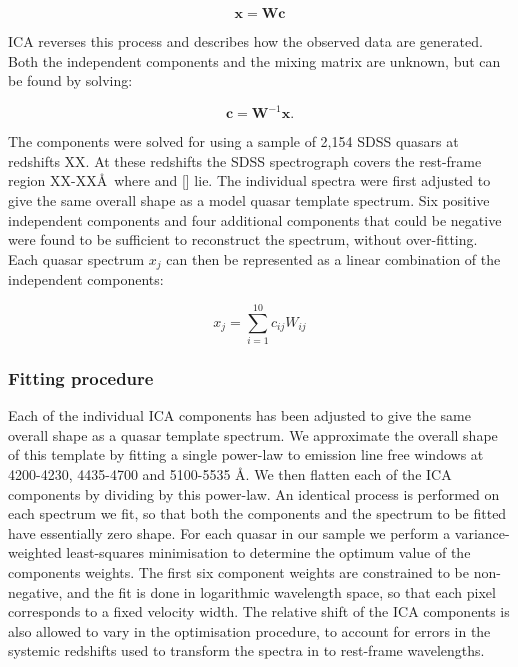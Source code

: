 \begin{equation}
    \bm{x} = \bm{W}\bm{c}
\end{equation}

\ac{ICA} reverses this process and describes how the observed data are generated. 
Both the independent components and the mixing matrix are unknown, but can be found by solving:

\begin{equation}
    \bm{c} = \bm{W}^{-1}\bm{x}.
\end{equation}

The components were solved for using a sample of 2,154 \ac{SDSS} quasars at redshifts XX. 
At these redshifts the \ac{SDSS} spectrograph covers the rest-frame region XX-XX\AA\, where \hb and [] lie. 
The individual spectra were first adjusted to give the same overall shape as a model quasar template spectrum.
Six positive independent components and four additional components that could be negative were found to be sufficient to reconstruct the spectrum, without over-fitting. 
Each quasar spectrum $x_j$ can then be represented as a linear combination of the independent components: 

\begin{equation}
    x_j = \sum_{i=1}^{10} c_{ij}W_{ij}
\end{equation}

\subsubsection{Fitting procedure}

Each of the individual \ac{ICA} components has been adjusted to give the same overall shape as a quasar template spectrum. 
We approximate the overall shape of this template by fitting a single power-law to emission line free windows at 4200-4230, 4435-4700 and 5100-5535 \AA. 
We then flatten each of the \ac{ICA} components by dividing by this power-law. 
An identical process is performed on each spectrum we fit, so that both the components and the spectrum to be fitted have essentially zero shape. 
For each quasar in our sample we perform a variance-weighted least-squares minimisation to determine the optimum value of the components weights.
The first six component weights are constrained to be non-negative, and the fit is done in logarithmic wavelength space, so that each pixel corresponds to a fixed velocity width.   
The relative shift of the \ac{ICA} components is also allowed to vary in the optimisation procedure, to account for errors in the systemic redshifts used to transform the spectra in to rest-frame wavelengths. 

